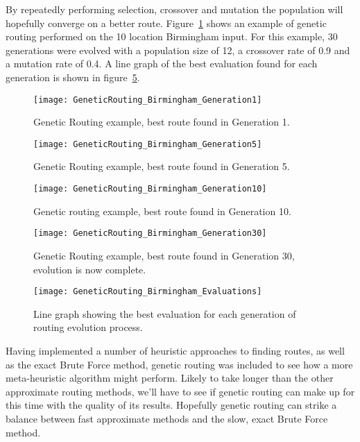 \noindent
By repeatedly performing selection, crossover and mutation the population will hopefully converge on a better route.
Figure~\ref{fig:GeneticRouting_Birmingham_Generation1} shows an example of genetic routing performed on the 10
location Birmingham input.
For this example, 30 generations were evolved with a population size of 12, a crossover rate of 0.9 and a mutation
rate of 0.4.
A line graph of the best evaluation found for each generation is shown in figure~\ref{fig:GeneticRouting_Birmingham_Evaluations}.
\begin{figure}[H]
    \ContinuedFloat*
    \centering
    \texttt{[image: GeneticRouting\_Birmingham\_Generation1]}
    \caption{Genetic Routing example, best route found in Generation 1.}
    \label{fig:GeneticRouting_Birmingham_Generation1}
\end{figure}
\begin{figure}[H]
    \ContinuedFloat
    \centering
    \texttt{[image: GeneticRouting\_Birmingham\_Generation5]}
    \caption{Genetic Routing example, best route found in Generation 5.}
    \label{fig:GeneticRouting_Birmingham_Generation5}
\end{figure}
\begin{figure}[H]
    \ContinuedFloat
    \centering
    \texttt{[image: GeneticRouting\_Birmingham\_Generation10]}
    \caption{Genetic routing example, best route found in Generation 10.}
    \label{fig:GeneticRouting_Birmingham_Generation10}
\end{figure}
\begin{figure}[H]
    \ContinuedFloat
    \centering
    \texttt{[image: GeneticRouting\_Birmingham\_Generation30]}
    \caption{Genetic Routing example, best route found in Generation 30, evolution is now complete.}
    \label{fig:GeneticRouting_Birmingham_Generation30}
\end{figure}
\begin{figure}[H]
    \centering
    \texttt{[image: GeneticRouting\_Birmingham\_Evaluations]}
    \caption{Line graph showing the best evaluation for each generation of routing evolution process.}
    \label{fig:GeneticRouting_Birmingham_Evaluations}
\end{figure}

\noindent
Having implemented a number of heuristic approaches to finding routes, as well as the exact Brute Force method,
genetic routing was included to see how a more meta-heuristic algorithm might perform.
Likely to take longer than the other approximate routing methods, we'll have to see if genetic routing can make up
for this time with the quality of its results.
Hopefully genetic routing can strike a balance between fast approximate methods and the slow, exact Brute Force method.

